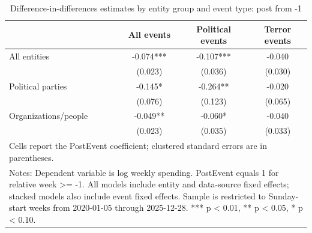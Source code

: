 \begin{table}[!htbp]
\centering
\caption{Difference-in-differences estimates by entity group and event type: post from -1}
\label{tab:did_key_results_post_from_minus1}
\begin{tabular}{lccc}
\hline\hline
 & All events & Political events & Terror events \\
\hline
All entities & -0.074*** & -0.107*** & -0.040 \\
 & (0.023) & (0.036) & (0.030) \\
Political parties & -0.145* & -0.264** & -0.020 \\
 & (0.076) & (0.123) & (0.065) \\
Organizations/people & -0.049** & -0.060* & -0.040 \\
 & (0.023) & (0.035) & (0.033) \\
\hline
\multicolumn{4}{l}{\footnotesize Cells report the PostEvent coefficient; clustered standard errors are in parentheses.}\\
\multicolumn{4}{l}{\footnotesize Notes: Dependent variable is log weekly spending. PostEvent equals 1 for relative week >= -1. All models include entity and data-source fixed effects; stacked models also include event fixed effects. Sample is restricted to Sunday-start weeks from 2020-01-05 through 2025-12-28. *** p < 0.01, ** p < 0.05, * p < 0.10.}\\
\hline\hline
\end{tabular}
\end{table}

